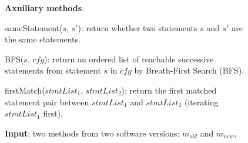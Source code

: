 \begin{figure}[t]
\textbf{Axuiliary methods}:

sameStatement($\mathit{s}$, $\mathit{s'}$): return whether two statements
$\mathit{s}$ and $\mathit{s'}$ are the same statements. 

BFS($\mathit{s}$, $\mathit{cfg}$): return an ordered list of reachable successive statements from statement $\mathit{s}$ in $\mathit{cfg}$ by Breath-First Search (BFS).

firstMatch($\mathit{stmtList_1}$, $\mathit{stmtList_2}$): return the first matched statement pair between $\mathit{stmtList_1}$ and $\mathit{stmtList_2}$ (iterating $\mathit{stmtList_1}$ first).


\textbf{Input}: two methods from two software versions: $\mathit{m_{old}}$ and $m_{new}$,


\end{figure}
